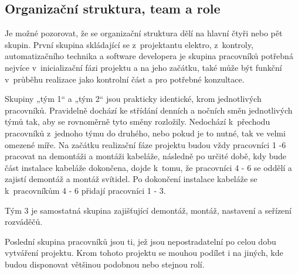 \documentclass[a4paper, twoside, 11pt]{article}
\begin{document}
	\subsection{Organizační struktura, team a role}
	Je možné pozorovat, že se organizační struktura dělí na hlavní čtyři nebo pět skupin. První skupina skládající se z~projektantu elektro, z~kontroly, automatizačního technika a software developera je skupina pracovníků potřebná nejvíce v~inicializační fázi projektu a na jeho začátku, také může být funkční v~průběhu realizace jako kontrolní část a pro potřebné konzultace.\par
	Skupiny „tým 1“ a „tým 2“ jsou prakticky identické, krom jednotlivých pracovníků. Pravidelně dochází ke střídání denních a nočních směn jednotlivých týmů tak, aby se rovnoměrně tyto směny rozložily. Nedochází k~přechodu pracovníků z~jednoho týmu do druhého, nebo pokud je to nutné, tak ve velmi omezené míře. Na začátku realizační fáze projektu budou vždy pracovníci 1 -6 pracovat na demontáži a montáži kabeláže, následně po určité době, kdy bude část instalace kabeláže dokončena, dojde k~tomu, že pracovníci 4 - 6 se oddělí a zajistí demontáž a montáž svítidel. Po dokončení instalace kabeláže se k~pracovníkům 4 - 6 přidají pracovníci 1 - 3.\par
	Tým 3 je samostatná skupina zajišťující demontáž, montáž, nastavení a seřízení rozváděčů.\par
	Poslední skupina pracovníků jsou ti, jež jsou nepostradatelní po celou dobu vytváření projektu. Krom tohoto projektu se mouhou podílet i na jiných, kde budou disponovat většinou podobnou nebo stejnou rolí.
\end{document}
